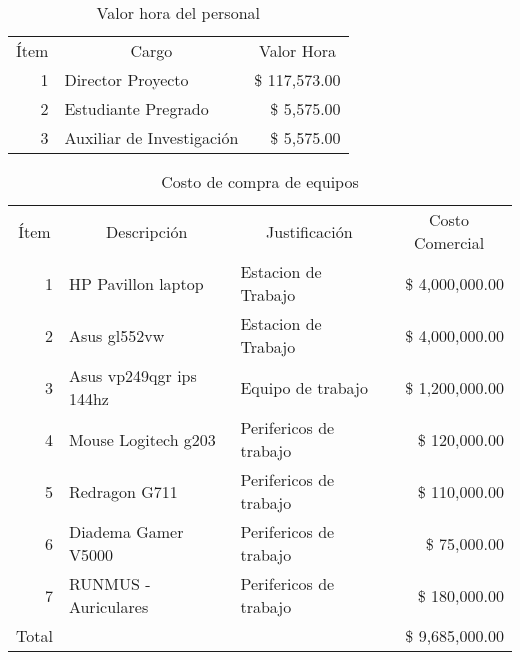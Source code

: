 \begin{table}[H]
    \centering
    \caption{Valor hora del personal}
    \footnotesize
    \begin{tabular}{rlr}
        \hline
        \multicolumn{1}{c}{Ítem} & \multicolumn{1}{c}{Cargo} & \multicolumn{1}{c}{Valor Hora} \bigstrut\\
        \cline{2-3}1 & Director Proyecto &  \$          117,573.00  \bigstrut[t]\\
        2 & Estudiante Pregrado &  \$               5,575.00  \\
        3 & Auxiliar de Investigación &  \$               5,575.00  \bigstrut[b]\\
        \hline
    \end{tabular}%
    \label{tab:valorhora}
\end{table}%

\begin{table}[H]
    \centering
    \caption{Costo de compra de equipos}
    \footnotesize
    \begin{tabular}{crrr}
        \hline
        Ítem & \multicolumn{1}{c}{Descripción} & \multicolumn{1}{c}{Justificación} & \multicolumn{1}{c}{Costo Comercial} \bigstrut\\
        \cline{2-4}\multicolumn{1}{r}{1} & \multicolumn{1}{l}{HP Pavillon laptop} & \multicolumn{1}{l}{Estacion de Trabajo} &  \$   4,000,000.00  \bigstrut[t]\\
        \multicolumn{1}{r}{2} & \multicolumn{1}{l}{Asus gl552vw} & \multicolumn{1}{l}{Estacion de Trabajo} &  \$   4,000,000.00  \\
        \multicolumn{1}{r}{3} & \multicolumn{1}{l}{Asus vp249qgr ips 144hz} & \multicolumn{1}{l}{Equipo de trabajo} &  \$   1,200,000.00  \\
        \multicolumn{1}{r}{4} & \multicolumn{1}{l}{Mouse Logitech g203} & \multicolumn{1}{l}{Perifericos de trabajo} &  \$      120,000.00  \\
        \multicolumn{1}{r}{5} & \multicolumn{1}{l}{Redragon G711} & \multicolumn{1}{l}{Perifericos de trabajo} &  \$      110,000.00  \\
        \multicolumn{1}{r}{6} & \multicolumn{1}{l}{Diadema Gamer V5000} & \multicolumn{1}{l}{Perifericos de trabajo} &  \$        75,000.00  \\
        \multicolumn{1}{r}{7} & \multicolumn{1}{l}{RUNMUS - Auriculares} & \multicolumn{1}{l}{Perifericos de trabajo} &  \$      180,000.00  \bigstrut[b]\\
        \cline{2-4}Total &   &   &  \$   9,685,000.00  \bigstrut\\
        \hline
    \end{tabular}%
  \label{tab:compraequipos}%
\end{table}%

